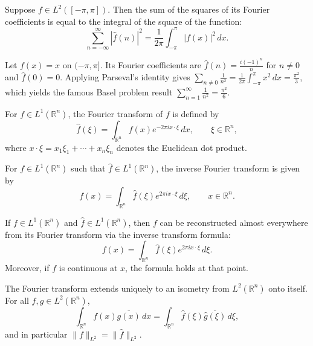 \begin{theorem}
Suppose $f \in L^2([-\pi, \pi])$. Then the sum of the squares of its Fourier coefficients is equal to the integral of the square of the function:
\[
\sum_{n=-\infty}^{\infty} |\hat{f}(n)|^2 = \frac{1}{2\pi} \int_{-\pi}^{\pi} |f(x)|^2 \, dx.
\]
\end{theorem}

\begin{example}
Let $f(x) = x$ on $(-\pi, \pi]$. Its Fourier coefficients are $\hat{f}(n) = \frac{i(-1)^n}{n}$ for $n \neq 0$ and $\hat{f}(0) = 0$. Applying Parseval's identity gives $\sum_{n \neq 0} \frac{1}{n^2} = \frac{1}{2\pi} \int_{-\pi}^{\pi} x^2 \, dx = \frac{\pi^2}{3}$, which yields the famous Basel problem result $\sum_{n=1}^\infty \frac{1}{n^2} = \frac{\pi^2}{6}$.
\end{example}

\begin{definition}
For $f \in L^1(\mathbb{R}^n)$, the Fourier transform of $f$ is defined by
\[
\hat{f}(\xi) = \int_{\mathbb{R}^n} f(x) e^{-2\pi i x \cdot \xi} \, dx,
\qquad \xi \in \mathbb{R}^n,
\]
where $x \cdot \xi = x_1 \xi_1 + \cdots + x_n \xi_n$ denotes the Euclidean dot product.
\end{definition}

\begin{definition}
For $f \in L^1(\mathbb{R}^n)$ such that $\hat{f} \in L^1(\mathbb{R}^n)$, the inverse Fourier transform is given by
\[
f(x) = \int_{\mathbb{R}^n} \hat{f}(\xi) e^{2\pi i x \cdot \xi} \, d\xi,
\qquad x \in \mathbb{R}^n.
\]
\end{definition}

\begin{theorem}
If $f \in L^1(\mathbb{R}^n)$ and $\hat{f} \in L^1(\mathbb{R}^n)$, then $f$ can be reconstructed almost everywhere from its Fourier transform via the inverse transform formula:
\[
f(x) = \int_{\mathbb{R}^n} \hat{f}(\xi) e^{2\pi i x \cdot \xi} \, d\xi.
\]
Moreover, if $f$ is continuous at $x$, the formula holds at that point.
\end{theorem}

\begin{theorem}
The Fourier transform extends uniquely to an isometry from $L^2(\mathbb{R}^n)$ onto itself. For all $f, g \in L^2(\mathbb{R}^n)$,
\[
\int_{\mathbb{R}^n} f(x) \overline{g(x)} \, dx = \int_{\mathbb{R}^n} \hat{f}(\xi) \overline{\hat{g}(\xi)} \, d\xi,
\]
and in particular $\|f\|_{L^2} = \|\hat{f}\|_{L^2}$.
\end{theorem}

